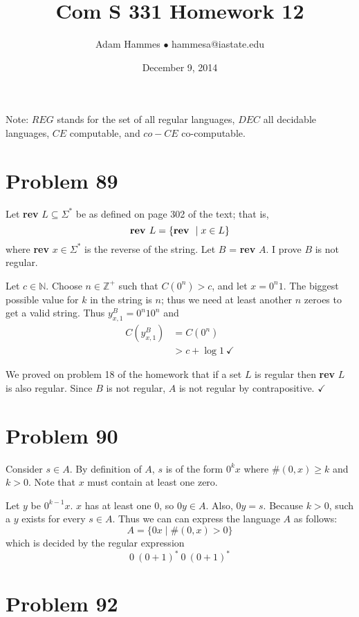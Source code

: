 \documentclass[11pt]{article}
\begin{document}
\title{Com S 331 Homework 12}
\author{Adam Hammes $\bullet$ hammesa@iastate.edu}
\date{December 9, 2014}
\maketitle

Note: $REG$ stands for the set of all regular languages, $DEC$ all decidable languages, $CE$ computable, and $co-CE$ co-computable.


\section*{Problem 89}

Let \textbf{rev} $L \subseteq \Sigma^*$ be as defined on page 302 of the text; that is,
	\[\text{\textbf{rev }} L = \{\text{\textbf{rev }} \mid x \in L\}\]
where \textbf{rev} $x \in \Sigma^*$ is the reverse of the string. Let $B$ = \textbf{rev} $A$.
I prove $B$ is not regular.

Let $c \in \mathbb{N}$.
Choose $n \in \mathbb{Z}^+$ such that $C(0^n) > c$, and let $x = 0^n1$.
The biggest possible value for $k$ in the string is $n$; thus we need at least another $n$ zeroes to get a valid string.
Thus $y^{B} _{x,1} = 0^n10^n$ and 
	\begin{align*}
		C( y^{B} _{x,1} ) &= C( 0^n) \\
		&> c + \log 1\ \checkmark
	\end{align*}

We proved on problem 18 of the homework that if a set $L$ is regular then \textbf{rev} $L$ is also regular.
Since $B$ is not regular, $A$ is not regular by contrapositive. $\checkmark$


\section*{Problem 90}

Consider $s \in A$.
By definition of $A$, $s$ is of the form $0^kx$ where $\#(0,x) \geq k$ and $k>0$.
Note that $x$ must contain at least one zero.

Let $y$ be $0^{k-1}x$. $x$ has at least one 0, so $0y \in A$.
Also, $0y = s$.
Because $k >0$, such a $y$ exists for every $s \in A$.
Thus we can can express the language $A$ as follows:
	\[ A = \{0x \mid \#(0,x) > 0 \}\]
which is decided by the regular expression
	\[ 0\ (0+1)^*\ 0\ (0+1)^*\]


\section*{Problem 92}
\end{document}

